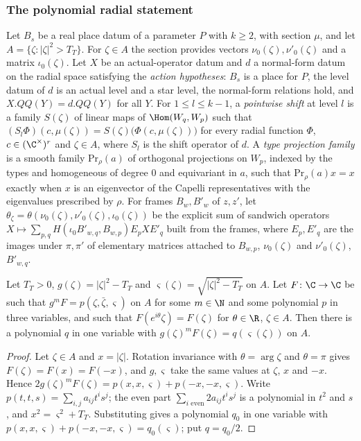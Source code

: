 \subsubsection{The polynomial radial statement}

Let $B_s$ be a real place datum of a parameter $P$ with $k\ge2$, with section $\mu$, and let $A=\{\zeta:|\zeta|^2>T_T\}$.
For $\zeta\in A$ the section provides vectors $\nu_0(\zeta),\nu'_0(\zeta)$ and a matrix $\iota_0(\zeta)$. Let $X$ be an
actual-operator datum and $d$ a normal-form datum on the radial space satisfying the \emph{action hypotheses}: $B_s$ is a
place for $P$, the level datum of $d$ is an actual level and a star level, the normal-form relations hold, and
$X.QQ(Y)=d.QQ(Y)$ for all $Y$. For $1\le l\le k-1$, a \emph{pointwise shift} at level $l$ is a family
$S(\zeta)$ of linear maps of $\Hom(W_q,W_p)$ such that $(S_l\Phi)(c,\mu(\zeta))=S(\zeta)\bigl(\Phi(c,\mu(\zeta))\bigr)$ for
every radial function $\Phi$, $c\in(\C^\times)^r$ and $\zeta\in A$, where $S_l$ is the shift operator of $d$. A \emph{type
projection family} is a smooth family $\mathrm{Pr}_\rho(a)$ of orthogonal projections on $W_p$, indexed by the types and
homogeneous of degree $0$ and equivariant in $a$, such that $\mathrm{Pr}_\rho(a)x=x$ exactly when $x$ is an eigenvector of
the Capelli representatives with the eigenvalues prescribed by $\rho$. For frames $B_w,B'_w$ of $z,z'$, let
$\theta_\zeta=\theta(\nu_0(\zeta),\nu'_0(\zeta),\iota_0(\zeta))$ be the explicit sum of sandwich operators
$X\mapsto\sum_{p,q}H(\iota_0B'_{w,q},B_{w,p})E_{p}XE'_{q}$ built from the frames, where $E_p,E'_q$ are the images under
$\pi,\pi'$ of elementary matrices attached to $B_{w,p}$, $\nu_0(\zeta)$ and $\nu'_0(\zeta)$, $B'_{w,q}$.

\begin{lemma}\label{pf:thmS-carrier:phaseextract}
Let $T_T>0$, $g(\zeta)=|\zeta|^2-T_T$ and $\varsigma(\zeta)=\sqrt{|\zeta|^2-T_T}$ on $A$. Let $F\colon\C\to\C$ be such that
$g^mF=p(\zeta,\bar\zeta,\varsigma)$ on $A$ for some $m\in\N$ and some polynomial $p$ in three variables, and such that
$F(e^{i\theta}\zeta)=F(\zeta)$ for $\theta\in\R$, $\zeta\in A$. Then there is a polynomial $q$ in one variable with
$g(\zeta)^mF(\zeta)=q(\varsigma(\zeta))$ on $A$.
\end{lemma}

\begin{proof}
Let $\zeta\in A$ and $x=|\zeta|$. Rotation invariance with $\theta=\arg\zeta$ and $\theta=\pi$ gives $F(\zeta)=F(x)=F(-x)$,
and $g,\varsigma$ take the same values at $\zeta$, $x$ and $-x$. Hence
$2g(\zeta)^mF(\zeta)=p(x,x,\varsigma)+p(-x,-x,\varsigma)$. Write $p(t,t,s)=\sum_{i,j}a_{ij}t^is^j$; the even part
$\sum_{i\text{ even}}2a_{ij}t^is^j$ is a polynomial in $t^2$ and $s$, and $x^2=\varsigma^2+T_T$. Substituting gives a polynomial
$q_0$ in one variable with $p(x,x,\varsigma)+p(-x,-x,\varsigma)=q_0(\varsigma)$; put $q=q_0/2$.
\end{proof}

